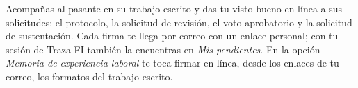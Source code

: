 \documentclass[11pt,a4paper]{article}
\begin{document}
{\small\tableofcontents}
\newpage
\begin{quevasahacer}
Acompañas al pasante en su trabajo escrito y das tu visto bueno en línea a sus solicitudes: el protocolo, la solicitud de revisión, el voto aprobatorio y la solicitud de sustentación. Cada firma te llega por correo con un enlace personal; con tu sesión de Traza FI también la encuentras en \emph{Mis pendientes}. En la opción \emph{Memoria de experiencia laboral} te toca firmar en línea, desde los enlaces de tu correo, los formatos del trabajo escrito.
\end{quevasahacer}



\end{document}
